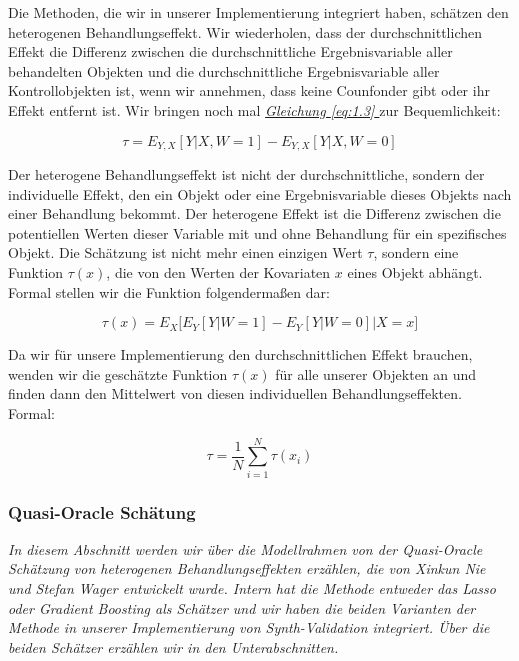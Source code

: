 \documentclass[12pt,a4paper,twoside]{scrartcl}
\numberwithin{equation}{section}
\renewcommand*{\refeq}[1]{\emph{\hyperref[#1]{Gleichung \ref*{#1} }}}
\begin{document}
Die Methoden, die wir in unserer Implementierung integriert haben, schätzen den heterogenen Behandlungseffekt. Wir wiederholen, dass der durchschnittlichen Effekt die Differenz zwischen die durchschnittliche Ergebnisvariable aller behandelten Objekten und die durchschnittliche Ergebnisvariable aller Kontrollobjekten ist, wenn wir annehmen, dass keine Counfonder gibt oder ihr Effekt entfernt ist. Wir bringen noch mal \refeq{eq:1.3} zur Bequemlichkeit:\par  

\begin{equation}\label{eq:2.11}
  \tau = E_{Y,X}[Y|X,W = 1] - E_{Y,X}[Y|X,W = 0]
\end{equation}

\noindent
Der heterogene Behandlungseffekt ist nicht der durchschnittliche, sondern der individuelle Effekt, den ein Objekt oder eine Ergebnisvariable dieses Objekts nach einer Behandlung bekommt. Der heterogene Effekt ist die Differenz zwischen die potentiellen Werten dieser Variable mit und ohne Behandlung für ein spezifisches Objekt. Die  Schätzung ist nicht mehr einen einzigen Wert $\tau$, sondern eine Funktion $\tau(x)$, die von den Werten der Kovariaten $x$ eines Objekt abhängt. Formal stellen wir die Funktion folgendermaßen dar:\par

\begin{equation}\label{eq:2.12}
  \tau(x) = E_X \Big [ E_{Y}[Y|W = 1] - E_{Y}[Y|W = 0] \Big | X=x \Big ]
\end{equation}

\noindent
Da wir für unsere Implementierung den durchschnittlichen Effekt brauchen, wenden wir die geschätzte Funktion $\tau(x)$ für alle unserer Objekten an und finden dann den Mittelwert von diesen individuellen Behandlungseffekten. Formal:\par

\begin{equation}\label{eq:2.13}
  \tau = \frac{1}{N} \sum_{i=1}^{N} \tau(x_i)
\end{equation}
  
\subsubsection{Quasi-Oracle Schätung}\label{subsubsec:quasioracle}
\noindent
\emph{In diesem Abschnitt werden wir über die Modellrahmen von der Quasi-Oracle Schätzung von heterogenen Behandlungseffekten\cite{nie2017quasi} erzählen, die von Xinkun Nie und Stefan Wager entwickelt wurde. Intern hat die Methode entweder das Lasso oder Gradient Boosting als Schätzer und wir haben die beiden Varianten der Methode in unserer Implementierung von Synth-Validation integriert. Über die beiden Schätzer erzählen wir in den Unterabschnitten.}\par  
\end{document}
